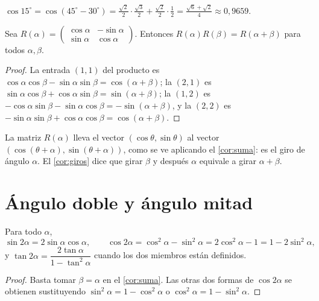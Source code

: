 \begin{ejemplo}\label{ej:cos15}
$\cos 15^{\circ}=\cos(45^{\circ}-30^{\circ})=\frac{\sqrt2}{2}\cdot\frac{\sqrt3}{2}+\frac{\sqrt2}{2}\cdot\frac12=\frac{\sqrt6+\sqrt2}{4}\approx 0{,}9659$.
\end{ejemplo}

\begin{corolario}\label{cor:giros}
Sea $R(\alpha)=\begin{pmatrix}\cos\alpha&-\sin\alpha\\ \sin\alpha&\cos\alpha\end{pmatrix}$. Entonces $R(\alpha)R(\beta)=R(\alpha+\beta)$ para todos $\alpha,\beta$.
\end{corolario}

\begin{proof}
La entrada $(1,1)$ del producto es $\cos\alpha\cos\beta-\sin\alpha\sin\beta=\cos(\alpha+\beta)$; la $(2,1)$ es $\sin\alpha\cos\beta+\cos\alpha\sin\beta=\sin(\alpha+\beta)$; la $(1,2)$ es $-\cos\alpha\sin\beta-\sin\alpha\cos\beta=-\sin(\alpha+\beta)$, y la $(2,2)$ es $-\sin\alpha\sin\beta+\cos\alpha\cos\beta=\cos(\alpha+\beta)$.
\end{proof}

La matriz $R(\alpha)$ lleva el vector $(\cos\theta,\sin\theta)$ al vector $(\cos(\theta+\alpha),\sin(\theta+\alpha))$, como se ve aplicando el \cref{cor:suma}: es el giro de ángulo $\alpha$. El \cref{cor:giros} dice que girar $\beta$ y después $\alpha$ equivale a girar $\alpha+\beta$.

\section{Ángulo doble y ángulo mitad}

\begin{proposicion}\label{prop:doble}
Para todo $\alpha$,
\[
\sin 2\alpha=2\sin\alpha\cos\alpha,\qquad \cos 2\alpha=\cos^{2}\alpha-\sin^{2}\alpha=2\cos^{2}\alpha-1=1-2\sin^{2}\alpha,
\]
y $\tan 2\alpha=\dfrac{2\tan\alpha}{1-\tan^{2}\alpha}$ cuando los dos miembros están definidos.
\end{proposicion}

\begin{proof}
Basta tomar $\beta=\alpha$ en el \cref{cor:suma}. Las otras dos formas de $\cos 2\alpha$ se obtienen sustituyendo $\sin^{2}\alpha=1-\cos^{2}\alpha$ o $\cos^{2}\alpha=1-\sin^{2}\alpha$.
\end{proof}

